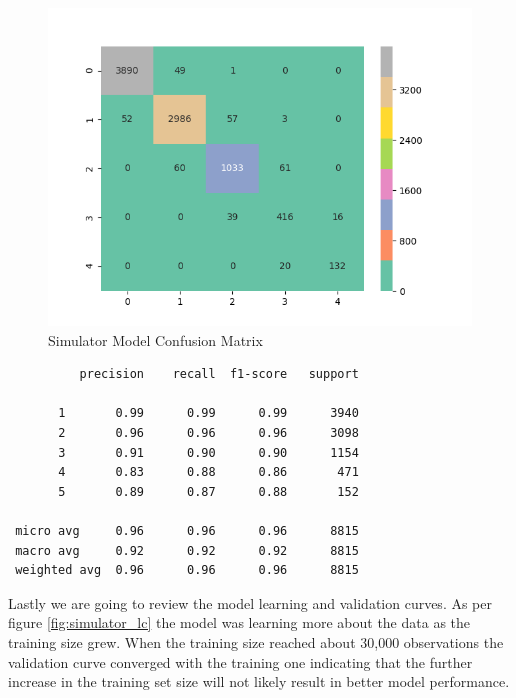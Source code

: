 \begin{Schunk}
\begin{figure}[H]

{\centering \includegraphics[width=1\linewidth]{../../models/training/simulator_rf_tuned_large_matrix} 

}

\caption[Simulator Model Confusion Matrix]{Simulator Model Confusion Matrix}\label{fig:simulator_cm}
\end{figure}
\end{Schunk}

\begin{verbatim}
          precision    recall  f1-score   support

       1       0.99      0.99      0.99      3940
       2       0.96      0.96      0.96      3098
       3       0.91      0.90      0.90      1154
       4       0.83      0.88      0.86       471
       5       0.89      0.87      0.88       152

 micro avg     0.96      0.96      0.96      8815
 macro avg     0.92      0.92      0.92      8815
 weighted avg  0.96      0.96      0.96      8815
\end{verbatim}

Lastly we are going to review the model learning and validation curves.
As per figure \ref{fig:simulator_lc} the model was learning more about
the data as the training size grew. When the training size reached about
30,000 observations the validation curve converged with the training one
indicating that the further increase in the training set size will not
likely result in better model performance.

